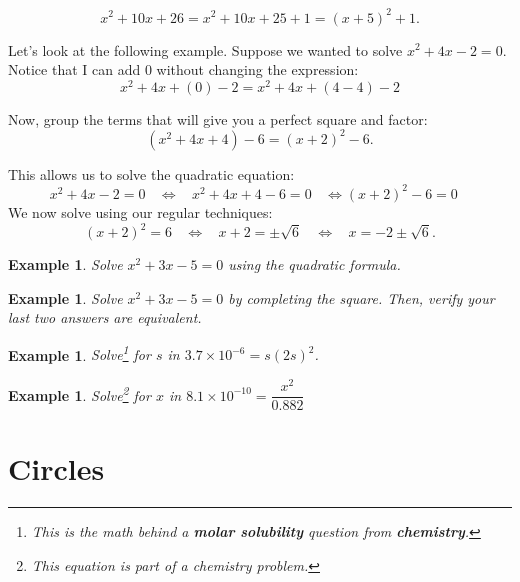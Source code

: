 \documentclass[twoside]{tufte-handout}
\newcommand{\booksection}{0}
\newcommand{\pageheader}{}
\newcounter{ekcounter}%
\theoremstyle{ekimcustom}
\newtheorem{exm}[ekcounter]{Example}
\begin{document}
$$x^2+10x+26=x^2+10x+25+1=(x+5)^2+1.$$

Let's look at the following example. Suppose we wanted to solve  $x^2+4x-2=0$. Notice that I can add 0 without changing the expression: 
$$ x^2+4x+(0)-2=x^2+4x+(4-4)-2$$

Now, group the terms that will give you a perfect square and factor: 
$$(x^2+4x+4)-6=(x+2)^2-6.$$

This allows us to solve the quadratic equation: 
	$$x^2+4x-2=0~~~~\Leftrightarrow~~~~ x^2+4x+4-6=0~~~~\Leftrightarrow (x+2)^2-6=0~~~~$$
 We now solve using our regular techniques: $$(x+2)^2=6~~~~\Leftrightarrow~~~~ x+2=\pm\sqrt{6}~~~~\Leftrightarrow~~~~ x=-2\pm\sqrt{6}.$$



\everymath{\displaystyle}
\begin{exm}{}Solve $x^2+3x-5=0$ using the quadratic formula.
\end{exm}\vskip10pt

\begin{exm}{}Solve $x^2+3x-5=0$ by completing the square. Then, verify your last two answers are equivalent.
\end{exm}\vskip10pt







\begin{exm}
Solve\footnote{This is the math behind a {\bf molar solubility} question from {\bf chemistry}.} for $s$ in $3.7 \times 10^{-6} = s(2s)^2$. 
\end{exm}
\vskip10pt

\begin{exm}
Solve\footnote{This equation is part of a chemistry problem.} for $x$ in $8.1 \times 10^{-10} = \dfrac{x^2}{0.882}$
\end{exm}




\renewcommand{\booksection}{Circles}
\renewcommand{\pageheader}{\booksection }
\section*{\LARGE \pageheader}
%
\end{document}
